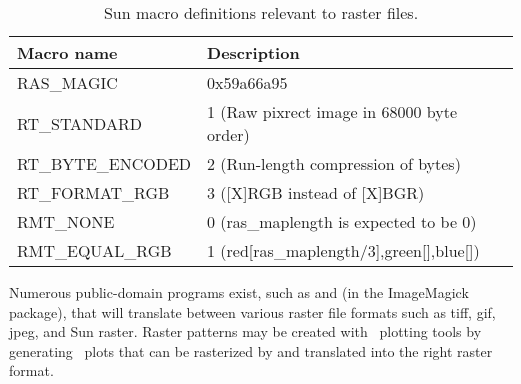 \begin{table}[H]
\centering
\begin{tabular}{ll} \hline
\textbf{Macro name} & \textbf{Description} \\ \hline\hline
RAS\_MAGIC & 0x59a66a95 \\
RT\_STANDARD & 1 (Raw pixrect image in 68000 byte order) \\
RT\_BYTE\_ENCODED & 2 (Run-length compression of bytes) \\
RT\_FORMAT\_RGB & 3 ([X]RGB instead of [X]BGR) \\
RMT\_NONE & 0 (ras\_maplength is expected to be 0) \\
RMT\_EQUAL\_RGB & 1 (red[ras\_maplength/3],green[],blue[]) \\ \hline
\end{tabular}

\caption{Sun macro definitions relevant to raster files.}
\label{tbl:sundef}
\end{table}

Numerous public-domain programs exist, such as  and
 (in the ImageMagick package), that will translate
between various raster file formats such as tiff, gif, jpeg, and
Sun raster.  Raster patterns may be created with \GMT\ plotting
tools by generating \PS\ plots that can be rasterized
by  and translated into the right raster format.

